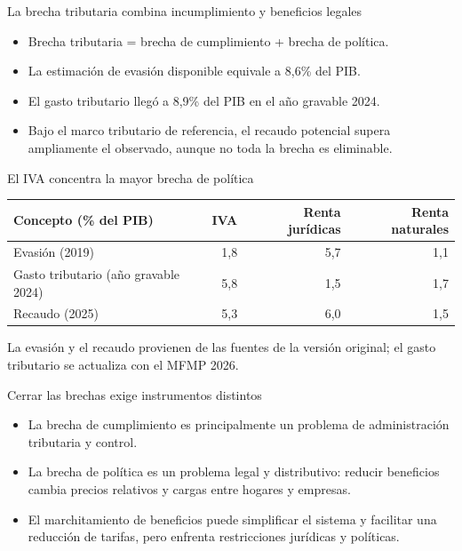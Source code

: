 \begin{frame}{La brecha tributaria combina incumplimiento y beneficios legales}
\begin{itemize}
    \item Brecha tributaria = brecha de cumplimiento + brecha de política.
    \item La estimación de evasión disponible equivale a 8,6\% del PIB.
    \item El gasto tributario llegó a 8,9\% del PIB en el año gravable 2024.
    \item Bajo el marco tributario de referencia, el recaudo potencial supera ampliamente el observado, aunque no toda la brecha es eliminable.
\end{itemize}
\end{frame}

\begin{frame}{El IVA concentra la mayor brecha de política}
\centering
\small
\begin{tabular}{lrrr}
\toprule
\textbf{Concepto (\% del PIB)} & \textbf{IVA} & \textbf{Renta jurídicas} & \textbf{Renta naturales} \\
\midrule
Evasión (2019)                    & 1,8 & 5,7 & 1,1 \\
Gasto tributario (año gravable 2024) & 5,8 & 1,5 & 1,7 \\
Recaudo (2025)                    & 5,3 & 6,0 & 1,5 \\
\bottomrule
\end{tabular}
\vspace{0.25cm}
\scriptsize La evasión y el recaudo provienen de las fuentes de la versión original; el gasto tributario se actualiza con el MFMP 2026.
\end{frame}

\begin{frame}{Cerrar las brechas exige instrumentos distintos}
\begin{itemize}
    \item La brecha de cumplimiento es principalmente un problema de administración tributaria y control.
    \item La brecha de política es un problema legal y distributivo: reducir beneficios cambia precios relativos y cargas entre hogares y empresas.
    \item El marchitamiento de beneficios puede simplificar el sistema y facilitar una reducción de tarifas, pero enfrenta restricciones jurídicas y políticas.
\end{itemize}
\end{frame}